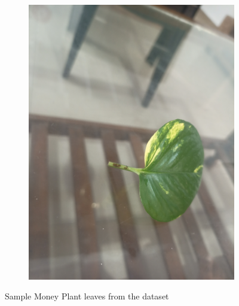 \documentclass[twocolumn]{article}
\begin{document}
\begin{figure}[H]
\begin{subfigure}[b]{0.30\columnwidth}
        \includegraphics[width=\textwidth]{money9}
    \end{subfigure}
    \caption{Sample Money Plant leaves from the dataset}
    \label{fig:money-samples}
\end{figure}
\end{document}
